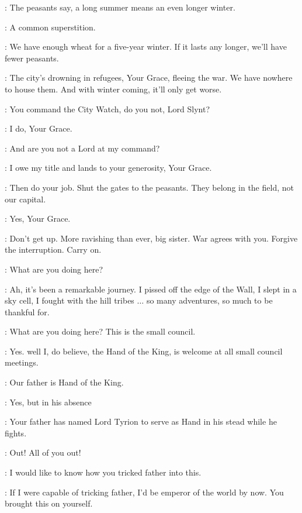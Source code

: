 \VARYS: The peasants say, a long summer means an even longer winter.

\PYCELLE: A common superstition.

\LITTLEFINGER: We have enough wheat for a five-year winter. If it lasts any longer, we'll have fewer peasants.

\JANOSSLYNT: The city's drowning in refugees, Your Grace, fleeing the war. We have nowhere to house them. And with winter coming, it'll only get worse.

\CERSEI: You command the City Watch, do you not, Lord Slynt?

\JANOSSLYNT: I do, Your Grace.

\CERSEI: And are you not a Lord at my command?

\JANOSSLYNT: I owe my title and lands to your generosity, Your Grace.

\CERSEI: Then do your job. Shut the gates to the peasants. They belong in the field, not our capital.

\JANOSSLYNT: Yes, Your Grace.


\TYRION: Don't get up. More ravishing than ever, big sister. War agrees with you. Forgive the interruption. Carry on.

\CERSEI: What are you doing here?

\TYRION: Ah, it's been a remarkable journey. I pissed off the edge of the Wall, I slept in a sky cell, I fought with the hill tribes $\ldots$ so many adventures, so much to be thankful for.

\CERSEI: What are you doing here? This is the small council.

\TYRION: Yes. well I, do believe, the Hand of the King, is welcome at all small council meetings.

\CERSEI: Our father is Hand of the King.

\TYRION: Yes, but in his absence 

\VARYS: Your father has named Lord Tyrion to serve as Hand in his stead while he fights.

\CERSEI: Out! All of you out!


\CERSEI: I would like to know how you tricked father into this.

\TYRION: If I were capable of tricking father, I'd be emperor of the world by now. You brought this on yourself.


